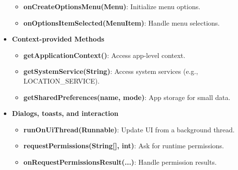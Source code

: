 \documentclass{report}
\begin{document}
\begin{itemize}
\begin{itemize}
                \item \textbf{onCreateOptionsMenu(Menu)}:	Initialize menu options.
                \item \textbf{onOptionsItemSelected(MenuItem)}:	Handle menu selections.
            \end{itemize}
        \item \textbf{Context-provided Methods}
            \begin{itemize}
                \item \textbf{getApplicationContext()}:	Access app-level context.
                \item \textbf{getSystemService(String)}:	Access system services (e.g., LOCATION\_SERVICE).
                \item \textbf{getSharedPreferences(name, mode)}:	App storage for small data.
            \end{itemize}
        \item \textbf{Dialogs, toasts, and interaction}
            \begin{itemize}
                \item \textbf{runOnUiThread(Runnable)}:	Update UI from a background thread.
                \item \textbf{requestPermissions(String[], int)}:	Ask for runtime permissions.
                \item \textbf{onRequestPermissionsResult(...)}:	Handle permission results.
            \end{itemize}
    \end{itemize}

    \pagebreak 
\end{document}
